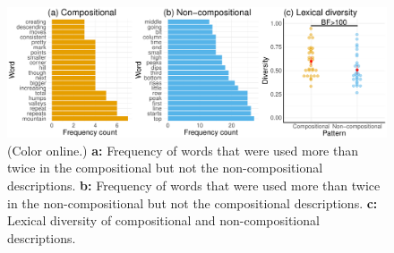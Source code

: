 \documentclass[a4paper,man, floatsintext, natbib]{apa6}
\begin{document}
\begin{figure}[h] 
\centerline{
\includegraphics[width=\textwidth]{textdiff.pdf}
}
\caption{(Color online.) \textbf{a:} Frequency of words that were used more than twice in the compositional but not the non-compositional descriptions. \textbf{b:} Frequency of words that were used more than twice in the non-compositional but not the compositional descriptions. \textbf{c:} Lexical diversity of compositional and non-compositional descriptions.}
\label{fig:descdiff}
\end{figure}
\end{document}
